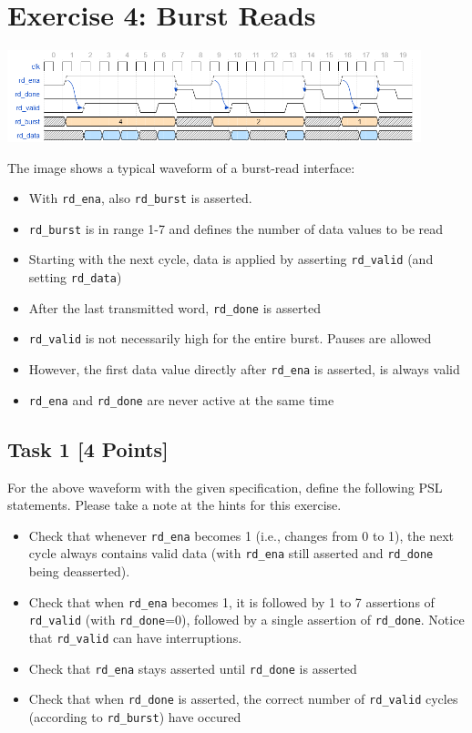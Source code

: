 \documentclass[12pt,epsf,makeidx,oneside]{book}
\begin{document}
\section{Exercise 4: Burst Reads}
\begin{center}
  \includegraphics[width=0.9\textwidth]{ex4}
\end{center}
The image shows a typical waveform of a burst-read interface:
\begin{itemize}
  \item With {\tt rd\_ena}, also {\tt rd\_burst} is asserted.
  \item {\tt rd\_burst} is in range 1-7 and defines the number of data values to be read
  \item Starting with the next cycle, data is applied by asserting {\tt rd\_valid} (and setting {\tt rd\_data})
  \item After the last transmitted word, {\tt rd\_done} is asserted
  \item {\tt rd\_valid} is not necessarily high for the entire burst. Pauses are allowed
  \item However, the first data value directly after {\tt rd\_ena} is asserted, is always valid
  \item {\tt rd\_ena} and {\tt rd\_done} are never active at the same time
\end{itemize}

\subsection{Task 1 [4 Points]}
For the above waveform with the given specification, define the following PSL statements. Please take a note at the hints for this exercise.
\begin{itemize}
  \item Check that whenever {\tt rd\_ena} becomes 1 (i.e., changes from 0 to 1), the next cycle always contains valid data (with {\tt rd\_ena} still asserted and {\tt rd\_done} being deasserted).
  \item Check that when {\tt rd\_ena} becomes 1, it is followed by 1 to 7 assertions of {\tt rd\_valid} (with {\tt rd\_done}=0), followed by a single assertion of {\tt rd\_done}. Notice that {\tt rd\_valid} can have interruptions.
  \item Check that {\tt rd\_ena} stays asserted until {\tt rd\_done} is asserted
  \item Check that when {\tt rd\_done} is asserted, the correct number of {\tt rd\_valid} cycles (according to {\tt rd\_burst}) have occured
\end{itemize}
\end{document}
